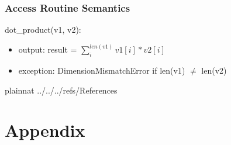 \documentclass[12pt, titlepage]{article}
\begin{document}
\subsubsection{Access Routine Semantics}

\noindent dot\_product(v1, v2):
\begin{itemize}
\item output: result = $\sum_i^{len(v1)} v1[i] * v2[i]$
\item exception: DimensionMismatchError if len(v1) $\neq$ len(v2)
\end{itemize}


\newpage

 {plainnat}
 {../../../refs/References}

\newpage

\section{Appendix} \label{Appendix}


\newpage{}
\end{document}
